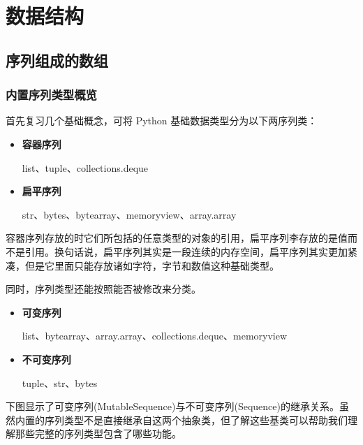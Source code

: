 \chapter{数据结构}
\section{序列组成的数组}
\subsection{内置序列类型概览}

首先复习几个基础概念，可将 Python 基础数据类型分为以下两序列类：

\begin{itemize}
    \item \textbf{容器序列}
    
    list、tuple、collections.deque
    \item \textbf{扁平序列}
    
    str、bytes、bytearray、memoryview、array.array
\end{itemize}

容器序列存放的时它们所包括的任意类型的对象的引用，扁平序列李存放的是值而不是引用。换句话说，扁平序列其实是一段连续的内存空间，扁平序列其实更加紧凑，但是它里面只能存放诸如字符，字节和数值这种基础类型。

同时，序列类型还能按照能否被修改来分类。

\begin{itemize}
    \item \textbf{可变序列}
    
    list、bytearray、array.array、collections.deque、memoryview

    \item \textbf{不可变序列}
    
    tuple、str、bytes
\end{itemize}

下图显示了可变序列(MutableSequence)与不可变序列(Sequence)的继承关系。虽然内置的序列类型不是直接继承自这两个抽象类，但了解这些基类可以帮助我们理解那些完整的序列类型包含了哪些功能。

